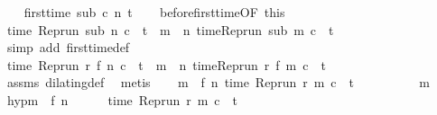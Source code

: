 \begin{isabellebody}
\isanewline
\ \ \isamarkupfalse%
\ {\isacartoucheopen}first{\isacharunderscore}time\ sub\ c\ n\ t{\isacartoucheclose}\isanewline
\ \ \isamarkupfalse%
\ before{\isacharunderscore}first{\isacharunderscore}time{\isacharbrackleft}OF\ this{\isacharbrackright}\isanewline
\ \ \ \ \isamarkupfalse%
\ {\isacharasterisk}{\isacharcolon}{\isacartoucheopen}time\ {\isacharparenleft}{\isacharparenleft}Rep{\isacharunderscore}run\ sub{\isacharparenright}\ n\ c{\isacharparenright}\ {\isacharequal}\ t\ {\isasymand}\ {\isacharparenleft}{\isasymforall}m\ {\isacharless}\ n{\isachardot}\ time{\isacharparenleft}{\isacharparenleft}Rep{\isacharunderscore}run\ sub{\isacharparenright}\ m\ c{\isacharparenright}\ {\isacharless}\ t{\isacharparenright}{\isacartoucheclose}\isanewline
\ \ \ \ \ \ \isamarkupfalse%
\ {\isacharparenleft}simp\ add{\isacharcolon}\ first{\isacharunderscore}time{\isacharunderscore}def{\isacharparenright}\isanewline
\ \ \isamarkupfalse%
\ {\isacharasterisk}{\isacharasterisk}{\isacharcolon}{\isacartoucheopen}time\ {\isacharparenleft}{\isacharparenleft}Rep{\isacharunderscore}run\ r{\isacharparenright}\ {\isacharparenleft}f\ n{\isacharparenright}\ c{\isacharparenright}\ {\isacharequal}\ t\ {\isasymand}\ {\isacharparenleft}{\isasymforall}m\ {\isacharless}\ n{\isachardot}\ time{\isacharparenleft}{\isacharparenleft}Rep{\isacharunderscore}run\ r{\isacharparenright}\ {\isacharparenleft}f\ m{\isacharparenright}\ c{\isacharparenright}\ {\isacharless}\ t{\isacharparenright}{\isacartoucheclose}\isanewline
\ \ \ \ \isamarkupfalse%
\ assms{\isacharparenleft}{}{\isacharparenright}\ dilating{\isacharunderscore}def\ \isamarkupfalse%
\ metis\isanewline
\ \ \isamarkupfalse%
\ {\isacartoucheopen}{\isasymforall}m\ {\isacharless}\ f\ n{\isachardot}\ time\ {\isacharparenleft}{\isacharparenleft}Rep{\isacharunderscore}run\ r{\isacharparenright}\ m\ c{\isacharparenright}\ {\isacharless}\ t{\isacartoucheclose}\isanewline
\ \ \isamarkupfalse%
\ {\isacharminus}\isanewline
\ \ \isacommand{{\isacharbraceleft}}\isamarkupfalse%
\ \isamarkupfalse%
\ m\ \isamarkupfalse%
\ hyp{\isacharcolon}{\isacartoucheopen}m\ {\isacharless}\ f\ n{\isacartoucheclose}\isanewline
\ \ \ \ \isamarkupfalse%
\ {\isacartoucheopen}time\ {\isacharparenleft}{\isacharparenleft}Rep{\isacharunderscore}run\ r{\isacharparenright}\ m\ c{\isacharparenright}\ {\isacharless}\ t{\isacartoucheclose}\isanewline
\ \ \ \ \isamarkupfalse%

\end{isabellebody}
